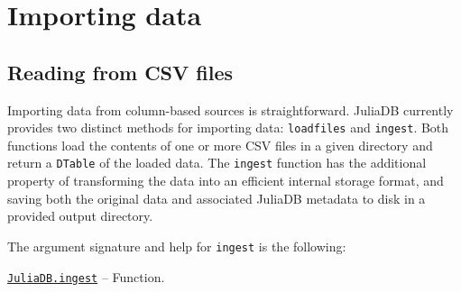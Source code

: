 \documentclass{memoir}
\begin{document}
\hypertarget{6968342998374166473}{}


\section{Importing data}



\hypertarget{11807903355386203129}{}


\subsection{Reading from CSV files}



Importing data from column-based sources is straightforward.  JuliaDB currently provides two distinct methods for importing data: \texttt{loadfiles} and \texttt{ingest}.  Both functions load the contents of one or more CSV files in a given directory and return a \texttt{DTable} of the loaded data.  The \texttt{ingest} function has the additional property of transforming the data into an efficient internal storage format, and saving both the original data and associated JuliaDB metadata to disk in a provided output directory.



The argument signature and help for \texttt{ingest} is the following:


\hypertarget{16292330238115158688}{} 
\hyperlink{16292330238115158688}{\texttt{JuliaDB.ingest}}  -- {Function.}
\end{document}

